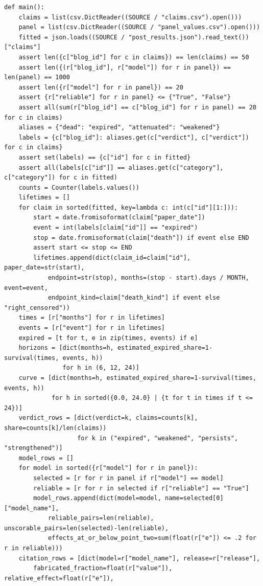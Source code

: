 \begin{Verbatim}[breaklines,breakanywhere,fontsize=\small]
def main():
    claims = list(csv.DictReader((SOURCE / "claims.csv").open()))
    panel = list(csv.DictReader((SOURCE / "panel_values.csv").open()))
    fitted = json.loads((SOURCE / "post_results.json").read_text())["claims"]
    assert len({c["blog_id"] for c in claims}) == len(claims) == 50
    assert len({(r["blog_id"], r["model"]) for r in panel}) == len(panel) == 1000
    assert len({r["model"] for r in panel}) == 20
    assert {r["reliable"] for r in panel} <= {"True", "False"}
    assert all(sum(r["blog_id"] == c["blog_id"] for r in panel) == 20 for c in claims)
    aliases = {"dead": "expired", "attenuated": "weakened"}
    labels = {c["blog_id"]: aliases.get(c["verdict"], c["verdict"]) for c in claims}
    assert set(labels) == {c["id"] for c in fitted}
    assert all(labels[c["id"]] == aliases.get(c["category"], c["category"]) for c in fitted)
    counts = Counter(labels.values())
    lifetimes = []
    for claim in sorted(fitted, key=lambda c: int(c["id"][1:])):
        start = date.fromisoformat(claim["paper_date"])
        event = int(labels[claim["id"]] == "expired")
        stop = date.fromisoformat(claim["death"]) if event else END
        assert start <= stop <= END
        lifetimes.append(dict(claim_id=claim["id"], paper_date=str(start),
            endpoint=str(stop), months=(stop - start).days / MONTH, event=event,
            endpoint_kind=claim["death_kind"] if event else "right_censored"))
    times = [r["months"] for r in lifetimes]
    events = [r["event"] for r in lifetimes]
    expired = [t for t, e in zip(times, events) if e]
    horizons = [dict(months=h, estimated_expired_share=1-survival(times, events, h))
                for h in (6, 12, 24)]
    curve = [dict(months=h, estimated_expired_share=1-survival(times, events, h))
             for h in sorted({0.0, 24.0} | {t for t in times if t <= 24})]
    verdict_rows = [dict(verdict=k, claims=counts[k], share=counts[k]/len(claims))
                    for k in ("expired", "weakened", "persists", "strengthened")]
    model_rows = []
    for model in sorted({r["model"] for r in panel}):
        selected = [r for r in panel if r["model"] == model]
        reliable = [r for r in selected if r["reliable"] == "True"]
        model_rows.append(dict(model=model, name=selected[0]["model_name"],
            reliable_pairs=len(reliable), unscorable_pairs=len(selected)-len(reliable),
            effects_at_or_below_point_two=sum(float(r["e"]) <= .2 for r in reliable)))
    citation_rows = [dict(model=r["model_name"], release=r["release"],
        fabricated_fraction=float(r["value"]), relative_effect=float(r["e"]),

\end{Verbatim}
